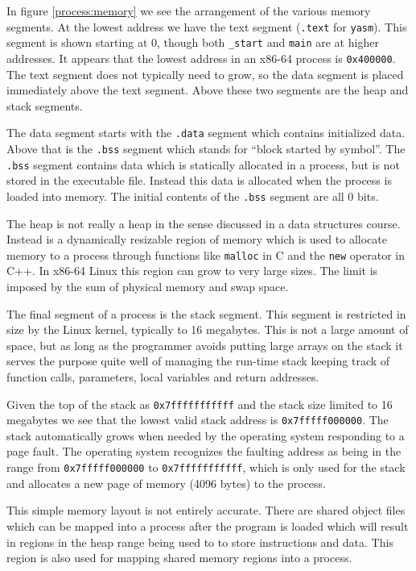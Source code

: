 \documentclass[11pt,b5paper]{book}
\begin{document}
In figure \ref{process:memory} we see the arrangement of the various memory
segments.
At the lowest address we have the text segment ({\tt .text} for {\tt yasm}).
This segment is shown starting at 0, though both {\tt \_start} and {\tt main} are at
higher addresses.
It appears that the lowest address in an x86-64 process is {\tt 0x400000}.
The text segment does not typically need to grow, so the data segment is
placed immediately above the text segment.
Above these two segments are the heap and stack segments.

The data segment starts with the {\tt .data} segment which contains 
initialized data.
Above that is the {\tt .bss} segment which stands for ``block started by 
symbol''.
The {\tt .bss} segment contains data which is statically allocated in a
process, but is not stored in the executable file.
Instead this data is allocated when the process is loaded into memory.
The initial contents of the {\tt .bss} segment are all 0 bits.

The heap is not really a heap in the sense discussed in a data structures 
course.
Instead is a dynamically resizable region of memory which is used to allocate
memory to a process through functions like {\tt malloc} in C and the {\tt new}
operator in C++.
In x86-64 Linux this region can grow to very large sizes.
The limit is imposed by the sum of physical memory and swap space.

The final segment of a process is the stack segment. 
This segment is restricted in size by the Linux kernel, typically to 16
megabytes.
This is not a large amount of space, but as long as the programmer avoids
putting large arrays on the stack it serves the purpose quite well of managing
the run-time stack keeping track of function calls, parameters, local
variables and return addresses.

Given the top of the stack as {\tt 0x7fffffffffff} and the stack size limited
to 16 megabytes we see that the lowest valid stack address is {\tt 0x7fffff000000}.
The stack automatically grows when needed by the operating system responding
to a page fault.
The operating system recognizes the faulting address as being in the range
from {\tt 0x7fffff000000} to {\tt 0x7fffffffffff}, which is only used for the
stack and allocates a new page of memory (4096 bytes) to the process.

This simple memory layout is not entirely accurate.
There are shared object files which can be mapped into a process after the
program is loaded which will result in regions in the heap range being used to
to store instructions and data.
This region is also used for mapping shared memory regions into a process.
\end{document}
